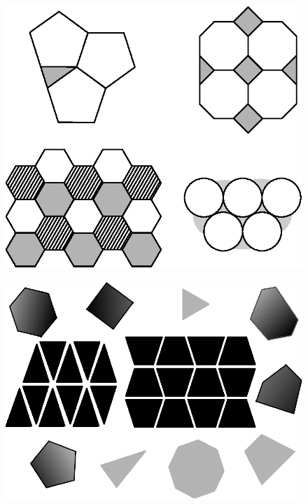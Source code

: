 \vskip 1cm

\begin{figure}[H]
\centering
\includegraphics[scale=.95]{figure/fig_22.eps}
\caption{}\label{chap6-fig22}
\end{figure}

\vfill\eject

\begin{figure}[H]
\centering
\includegraphics[scale=.9]{figure/fig_23.eps}
\caption{}\label{chap6-fig23}
\end{figure}

